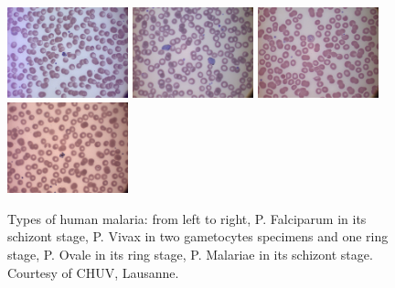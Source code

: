 \documentclass[sensors,review,submit,moreauthors,pdftex,10pt,a4paper]{mdpi}
\begin{document}
\iftrue
\begin{figure}[!t]
	\centering
	\includegraphics[width=3.5cm]{img/f2_Pfalciparum}
	\includegraphics[width=3.5cm]{img/f2_Pvivax}
	\includegraphics[width=3.5cm]{img/f2_Povale}
	\includegraphics[width=3.5cm]{img/f2_Pmalariae}
	\caption{\label{fig:malaria_types}Types of human malaria: from left to right, P. Falciparum in its schizont stage, P. Vivax in two gametocytes specimens and one ring stage, P. Ovale in its ring stage, P. Malariae in its schizont stage.\newline
	Courtesy of CHUV, Lausanne.}
\end{figure}
\fi
\end{document}
